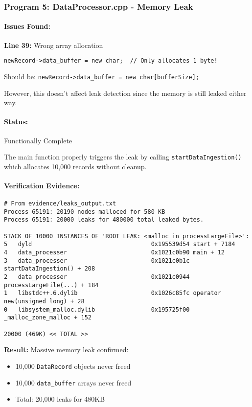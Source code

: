 \documentclass[11pt,a4paper]{article}
\begin{document}
\subsubsection{Program 5: DataProcessor.cpp - Memory Leak}

\paragraph{Issues Found:}

\textbf{Line 39:} Wrong array allocation
\begin{lstlisting}[style=cpp]
newRecord->data_buffer = new char;  // Only allocates 1 byte!
\end{lstlisting}
Should be: \texttt{newRecord->data\_buffer = new char[bufferSize];}

However, this doesn't affect leak detection since the memory is still leaked either way.

\paragraph{Status:} \checkmark Functionally Complete

The main function properly triggers the leak by calling \texttt{startDataIngestion()} which allocates 10,000 records without cleanup.

\paragraph{Verification Evidence:}
\begin{verbatim}
# From evidence/leaks_output.txt
Process 65191: 20190 nodes malloced for 580 KB
Process 65191: 20000 leaks for 480000 total leaked bytes.

STACK OF 10000 INSTANCES OF 'ROOT LEAK: <malloc in processLargeFile>':
5   dyld                                  0x195539d54 start + 7184
4   data_processer                        0x1021c0b90 main + 12
3   data_processer                        0x1021c0b1c startDataIngestion() + 208
2   data_processer                        0x1021c0944 processLargeFile(...) + 184
1   libstdc++.6.dylib                     0x1026c85fc operator new(unsigned long) + 28
0   libsystem_malloc.dylib                0x195725f00 _malloc_zone_malloc + 152

20000 (469K) << TOTAL >>
\end{verbatim}

\textbf{Result:} Massive memory leak confirmed:
\begin{itemize}
    \item 10,000 \texttt{DataRecord} objects never freed
    \item 10,000 \texttt{data\_buffer} arrays never freed
    \item Total: 20,000 leaks for 480KB
\end{itemize}
\end{document}
